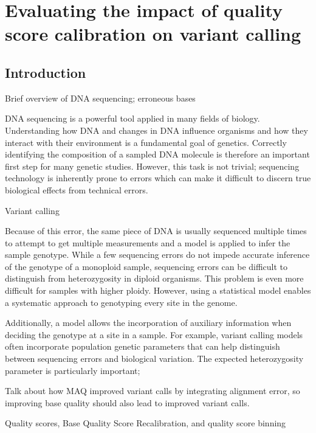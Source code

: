 \documentclass{report}
\begin{document}
\linenumbers

\chapter{Evaluating the impact of quality score calibration on variant calling}

\section{Introduction}
\begin{outline}
\item Brief overview of DNA sequencing; erroneous bases
	\begin{outline}
	\item DNA sequencing is a powerful tool applied in many fields of biology. Understanding how DNA and changes in DNA influence organisms and how they interact with their environment is a fundamental goal of genetics. Correctly identifying the composition of a sampled DNA molecule is therefore an important first step for many genetic studies. However, this task is not trivial; sequencing technology is inherently prone to errors which can make it difficult to discern true biological effects from technical errors. 
	\end{outline}
\item Variant calling
	\begin{outline}
	\item Because of this error, the same piece of DNA is usually sequenced multiple times to attempt to get multiple measurements and a model is applied to infer the sample genotype. While a few sequencing errors do not impede accurate inference of the genotype of a monoploid sample, sequencing errors can be difficult to distinguish from heterozygosity in diploid organisms. This problem is even more difficult for samples with higher ploidy. However, using a statistical model enables a systematic approach to genotyping every site in the genome.
	\item Additionally, a model allows the incorporation of auxiliary information when deciding the genotype at a site in a sample. For example, variant calling models often incorporate population genetic parameters that can help distinguish between sequencing errors and biological variation. The expected heterozygosity parameter \theta is particularly important;
	\end{outline}
	\item Talk about how MAQ improved variant calls by integrating alignment error, so improving base quality should also lead to improved variant calls.
\item Quality scores, Base Quality Score Recalibration, and quality score binning
\end{outline}
\end{document}
